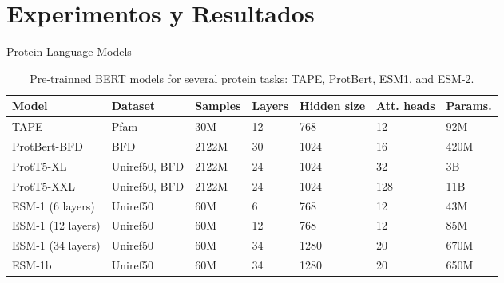 \documentclass[10pt]{beamer}
\newcommand{\1}{
	\setbeamertemplate{background}{
		\texttt{[image: ../img/1]}
		\tikz[overlay] \fill[fill opacity=0.75,fill=white] (0,0) rectangle (-\paperwidth,\paperheight);
	}
}
\begin{document}
	\section{Experimentos y Resultados}
	
	\begin{frame}{Protein Language Models}{}	
		\begin{table}[h]%
			\centering
			\scriptsize
			\caption{Pre-trainned BERT models for several protein tasks: TAPE, ProtBert, ESM1, and ESM-2.}%
			
			\label{tab:pretrained}
			
			\setlength{\tabcolsep}{0.5em} %
			{\renewcommand{\arraystretch}{1.1}%
				\scriptsize
				\begin{tabular}{lllllll}
					
					\textbf{Model}   & \textbf{Dataset} & \textbf{Samples} & \textbf{Layers} & \textbf{Hidden size} & \textbf{Att. heads} & \textbf{Params.} \\ \hline
					
					TAPE             & Pfam             & 30M                   & 12              & 768                  & 12                       & 92M                 \\
					ProtBert-BFD     & BFD              & 2122M                 & 30              & 1024                 & 16                       & 420M                \\
					
					ProtT5-XL     & Uniref50, BFD              & 2122M                 & 24              & 1024                 & 32                       & 3B                \\
					
					ProtT5-XXL     & Uniref50, BFD              & 2122M                 & 24              & 1024                 & 128                       & 11B                \\
					
					
					
					ESM-1 (6 layers)  & Uniref50         & 60M                   & 6               & 768                  & 12                       & 43M                  \\
					ESM-1 (12 layers)  & Uniref50         & 60M                   & 12               & 768                  & 12                       & 85M                  \\
					ESM-1 (34 layers)  & Uniref50         & 60M                   & 34               & 1280                  & 20                       & 670M                  \\
					ESM-1b  & Uniref50         & 60M                   & 34               & 1280                  & 20                       & 650M                  \\
					

\end{tabular}}
\end{table}
\end{frame}
\end{document}
